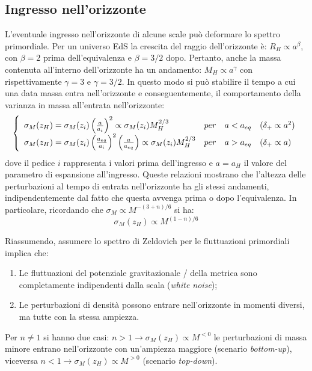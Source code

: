 \subsection{Ingresso nell'orizzonte}
L'eventuale ingresso nell'orizzonte di alcune scale può deformare lo spettro primordiale. Per un universo EdS la crescita del raggio dell'orizzonte è: $R_H\propto a^\beta$, con $\beta = 2$ prima dell'equivalenza e $\beta =3/2$ dopo. Pertanto, anche la massa contenuta all'interno dell'orizzonte ha un andamento: $M_H\propto a^\gamma$ con rispettivamente $\gamma=3$ e $\gamma=3/2$. In questo modo si può stabilire il tempo a cui una data massa entra nell'orizzonte e conseguentemente, il comportamento della varianza in massa all'entrata nell'orizzonte:
\begin{equation}\left\{
    \def\arraystretch{1.5}
        \begin{array}{llll}
        \sigma_M (z_H) = \sigma_M (z_i) \left(\frac{a}{a_{i}}\right)^2\propto \sigma_M (z_i)  M_H^{2/3} & per & a < a_{eq} &  (\delta_+ \propto a^2) \\
        \sigma_M (z_H) = \sigma_M (z_i) \left(\frac{a_{eq}}{a_{i}}\right)^2\left(\frac{a}{a_{eq}}\right)\propto \sigma_M (z_i)  M_H^{2/3} & per & a > a_{eq} &  (\delta_+ \propto a)
    \end{array}\right. \label{eq8:primadopoh}
\end{equation}
dove il pedice $i$ rappresenta i valori prima dell'ingresso e $a=a_H$ il valore del parametro di espansione all'ingresso. Queste relazioni mostrano che l'altezza delle perturbazioni al tempo di entrata nell'orizzonte ha gli stessi andamenti, indipendentemente dal fatto che questa avvenga prima o dopo l'equivalenza. In particolare, ricordando che $\sigma_M \propto M^{-(3+n)/6}$ si ha: 
$$
\sigma_M (z_H) \propto M^{(1-n)/6}
$$

Riassumendo, assumere lo spettro di Zeldovich per le fluttuazioni primordiali implica che:
\begin{enumerate}
    \item Le fluttuazioni del potenziale gravitazionale / della metrica sono completamente indipendenti dalla scala (\textit{white noise});
    \item Le perturbazioni di densità possono entrare nell’orizzonte in momenti diversi, ma tutte con la stessa ampiezza.
\end{enumerate}

Per $n\neq1$ si hanno due casi: $n>1 \rightarrow \sigma_M (z_H)\propto M^{<0}$ le perturbazioni di massa minore entrano nell’orizzonte con un'ampiezza maggiore (scenario \textit{bottom-up}), viceversa $n<1 \rightarrow \sigma_M (z_H)\propto M^{>0}$ (scenario \textit{top-down}).

